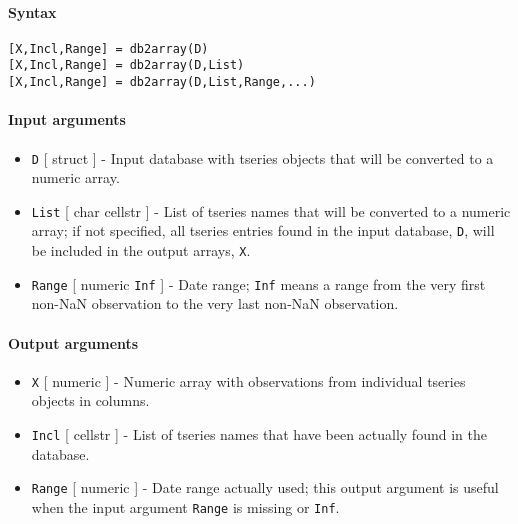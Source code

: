 


	\paragraph{Syntax}

\begin{verbatim}
[X,Incl,Range] = db2array(D)
[X,Incl,Range] = db2array(D,List)
[X,Incl,Range] = db2array(D,List,Range,...)
\end{verbatim}

\paragraph{Input arguments}

\begin{itemize}
\item
  \texttt{D} {[} struct {]} - Input database with tseries objects that
  will be converted to a numeric array.
\item
  \texttt{List} {[} char \textbar{} cellstr {]} - List of tseries names
  that will be converted to a numeric array; if not specified, all
  tseries entries found in the input database, \texttt{D}, will be
  included in the output arrays, \texttt{X}.
\item
  \texttt{Range} {[} numeric \textbar{} \texttt{Inf} {]} - Date range;
  \texttt{Inf} means a range from the very first non-NaN observation to
  the very last non-NaN observation.
\end{itemize}

\paragraph{Output arguments}

\begin{itemize}
\item
  \texttt{X} {[} numeric {]} - Numeric array with observations from
  individual tseries objects in columns.
\item
  \texttt{Incl} {[} cellstr {]} - List of tseries names that have been
  actually found in the database.
\item
  \texttt{Range} {[} numeric {]} - Date range actually used; this output
  argument is useful when the input argument \texttt{Range} is missing
  or \texttt{Inf}.
\end{itemize}

